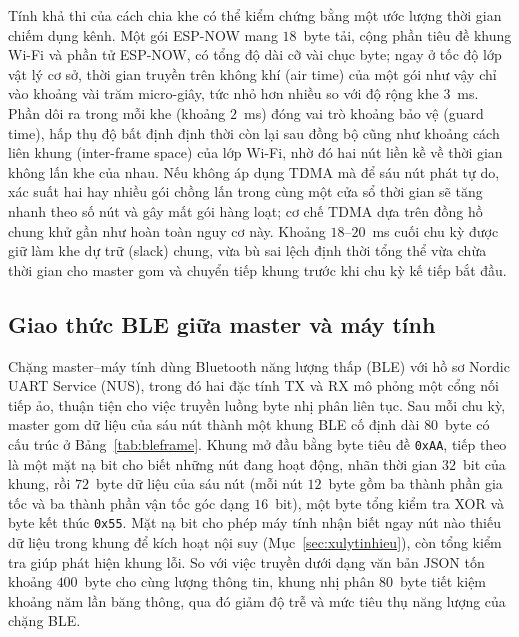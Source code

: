 \documentclass[../DoAn.tex]{subfiles}
\begin{document}
Tính khả thi của cách chia khe có thể kiểm chứng bằng một ước lượng thời gian
chiếm dụng kênh. Một gói ESP-NOW mang $18$~byte tải, cộng phần tiêu đề khung
Wi-Fi và phần tử ESP-NOW, có tổng độ dài cỡ vài chục byte; ngay ở tốc độ lớp vật
lý cơ sở, thời gian truyền trên không khí (air time) của một gói như vậy chỉ vào
khoảng vài trăm micro-giây, tức nhỏ hơn nhiều so với độ rộng khe $3$~ms. Phần
dôi ra trong mỗi khe (khoảng $2$~ms) đóng vai trò khoảng bảo vệ (guard time), hấp
thụ độ bất định định thời còn lại sau đồng bộ cũng như khoảng cách liên khung
(inter-frame space) của lớp Wi-Fi, nhờ đó hai nút liền kề về thời gian không lấn
khe của nhau. Nếu không áp dụng TDMA mà để sáu nút phát tự do, xác suất hai hay
nhiều gói chồng lấn trong cùng một cửa sổ thời gian sẽ tăng nhanh theo số nút và
gây mất gói hàng loạt; cơ chế TDMA dựa trên đồng hồ chung khử gần như hoàn toàn
nguy cơ này. Khoảng $18$--$20$~ms cuối chu kỳ được giữ làm khe dự trữ (slack)
chung, vừa bù sai lệch định thời tổng thể vừa chừa thời gian cho master gom và
chuyển tiếp khung trước khi chu kỳ kế tiếp bắt đầu.

\subsection{Giao thức BLE giữa master và máy tính}
\label{subsec:tx_ble}
Chặng master--máy tính dùng Bluetooth năng lượng thấp (BLE) với hồ sơ Nordic UART
Service (NUS), trong đó hai đặc tính TX và RX mô phỏng một cổng nối tiếp ảo, thuận
tiện cho việc truyền luồng byte nhị phân liên tục. Sau mỗi chu kỳ, master gom dữ
liệu của sáu nút thành một khung BLE cố định dài $80$~byte có cấu trúc ở
Bảng~\ref{tab:bleframe}. Khung mở đầu bằng byte tiêu đề \texttt{0xAA}, tiếp theo là
một mặt nạ bit cho biết những nút đang hoạt động, nhãn thời gian $32$~bit của
khung, rồi $72$~byte dữ liệu của sáu nút (mỗi nút $12$~byte gồm ba thành phần gia
tốc và ba thành phần vận tốc góc dạng $16$~bit), một byte tổng kiểm tra XOR và byte
kết thúc \texttt{0x55}. Mặt nạ bit cho phép máy tính nhận biết ngay nút nào thiếu dữ
liệu trong khung để kích hoạt nội suy (Mục~\ref{sec:xulytinhieu}), còn tổng kiểm
tra giúp phát hiện khung lỗi. So với việc truyền dưới dạng văn bản JSON tốn khoảng
$400$~byte cho cùng lượng thông tin, khung nhị phân $80$~byte tiết kiệm khoảng năm
lần băng thông, qua đó giảm độ trễ và mức tiêu thụ năng lượng của chặng BLE.
\end{document}
